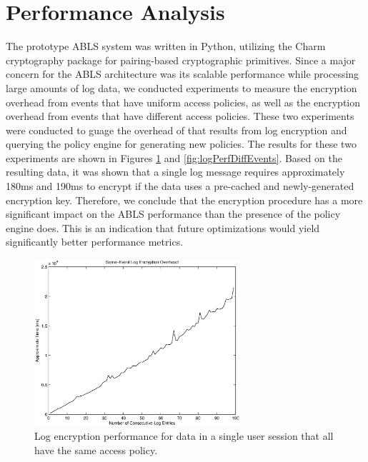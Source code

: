 \documentclass{sig-alternate}
\begin{document}
\section{Performance Analysis}
The prototype ABLS system was written in Python, utilizing the Charm cryptography package 
\cite{akinyelecharm} for pairing-based cryptographic primitives. Since a major concern for the ABLS architecture 
was its scalable performance while processing large amounts of log data, we conducted experiments
to measure the encryption overhead from events that have uniform access policies, as well as the
encryption overhead from events that have different access policies. These two experiments were conducted to
guage the overhead of that results from log encryption and querying the policy engine for generating new policies.
The results for these two experiments are shown in Figures \ref{fig:logPerf} and \ref{fig:logPerfDiffEvents}. Based
on the resulting data, it was shown that a single log message requires approximately 180ms and 190ms to encrypt
if the data uses a pre-cached and newly-generated encryption key. Therefore, we conclude that the encryption
procedure has a more significant impact on the ABLS performance than the presence of the policy engine does. 
This is an indication that future optimizations would yield significantly better performance metrics.

\begin{figure}[ht!]
\begin{center}
\includegraphics[width=3in]{images/logPerf.eps}
\caption{Log encryption performance for data in a single user session that all have the same access policy.}
\label{fig:logPerf}
\end{center}
\end{figure}
\end{document}
